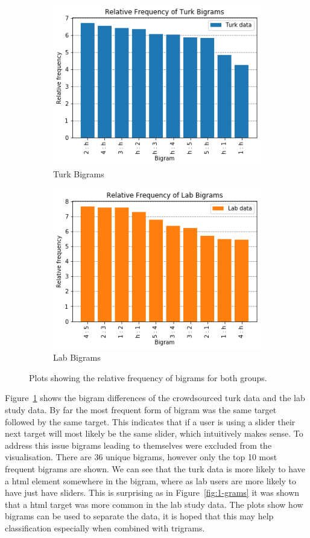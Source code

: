 \documentclass{article}
\begin{document}
\begin{figure}[h!]
    \centering
    \begin{subfigure}[c]{0.4\linewidth}
        \centering
        \includegraphics[scale=0.55]{Images/turk-bigrams.png}
        \caption{Turk Bigrams}
    \end{subfigure}    
    \hfill
    \begin{subfigure}[c]{0.4\linewidth}
        \centering
        \includegraphics[scale=0.55]{Images/lab-bigrams.png}
        \caption{Lab Bigrams}
    \end{subfigure}  
    \caption{Plots showing the relative frequency of bigrams for both groups.}
    \label{fig:bigrams}
\end{figure}

Figure~\ref{fig:bigrams} shows the bigram differences of the crowdsourced turk data and the lab study data.
By far the most frequent form of bigram was the same target followed by the same target.
This indicates that if a user is using a slider their next target will most likely be the same slider, which intuitively makes sense.
To address this issue bigrams leading to themselves were excluded from the visualisation.
There are 36 unique bigrams, however only the top 10 most frequent bigrams are shown.
We can see that the turk data is more likely to have a html element somewhere in the bigram, where as lab users are more likely to have just have sliders.
This is surprising as in Figure~\ref{fig:1-grams} it was shown that a html target was more common in the lab study data.
The plots show how bigrams can be used to separate the data, it is hoped that this may help classification especially when combined with trigrams.
\end{document}
